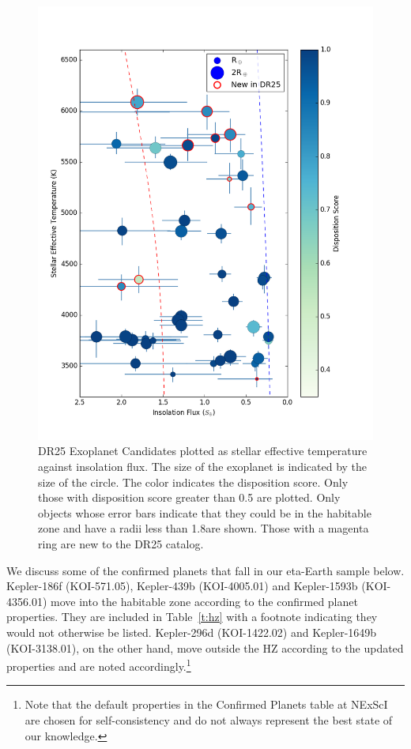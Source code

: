 \begin{figure}
    \centering
    \includegraphics[width=1.1\linewidth]{fig-hzTstarInsol.png}
    \caption{DR25 Exoplanet Candidates plotted as stellar effective temperature against insolation flux. The size of the exoplanet is indicated by the size of the circle.  The color indicates the disposition score. Only those with disposition score greater than 0.5 are plotted.  Only objects whose error bars indicate that they could be in the habitable zone and have a radii less than 1.8\re are shown. Those with a magenta ring are new to the DR25 catalog. }
    \label{f:hzNarrow}
\end{figure}





We discuss some of the confirmed planets that fall in our eta-Earth sample below.  Kepler-186f (KOI-571.05), Kepler-439b (KOI-4005.01) and Kepler-1593b (KOI-4356.01) move into the habitable zone according to the confirmed planet properties. They are included in Table~\ref{t:hz} with a footnote indicating they would not otherwise be listed. Kepler-296d (KOI-1422.02) and Kepler-1649b (KOI-3138.01), on the other hand, move outside the HZ according to the updated properties and are noted accordingly.\footnote{Note that the default properties in the Confirmed Planets table at NExScI are chosen for self-consistency and do not always represent the best state of our knowledge.} 

